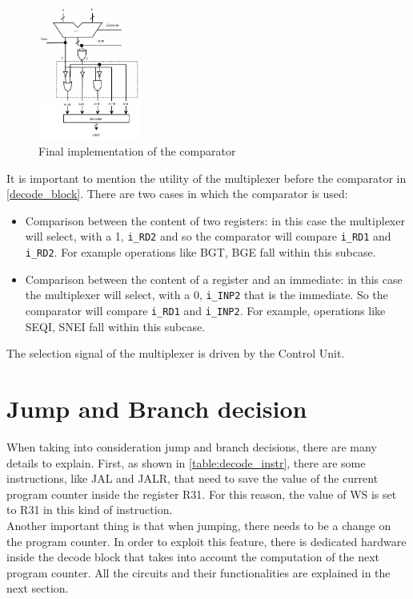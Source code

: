 \begin{figure}[H]
	\centering
	\includegraphics[width=0.3\textwidth]{chapters/4_DecodeStage/images/cmp_final.pdf}
	\caption{Final implementation of the comparator}
	\label{cmp_final}
\end{figure}

\newpage
It is important to mention the utility of the multiplexer before the comparator in \autoref{decode_block}. There are two cases in which the comparator is used:

\begin{itemize}
  \item Comparison between the content of two registers: in this case the multiplexer will select, with a 1, \texttt{i\_RD2} and so the comparator will compare \texttt{i\_RD1} and \texttt{i\_RD2}. For example operations like BGT, BGE fall within this subcase. 
  \item Comparison between the content of a register and an immediate: in this case the multiplexer will select, with a 0, \texttt{i\_INP2} that is the immediate. So the comparator will compare \texttt{i\_RD1} and \texttt{i\_INP2}. For example, operations like SEQI, SNEI fall within this subcase. 
\end{itemize}

The selection signal of the multiplexer is driven by the Control Unit.

\section{Jump and Branch decision}
When taking into consideration jump and branch decisions, there are many details to explain. First, as shown in \autoref{table:decode_instr}, there are some instructions, like JAL and JALR, that need to save the value of the current program counter inside the register R31. For this reason, the value of WS is set to R31 in this kind of instruction. \\

Another important thing is that when jumping, there needs to be a change on the program counter. In order to exploit this feature, there is dedicated hardware inside the decode block that takes into account the computation of the next program counter. All the circuits and their functionalities are explained in the next section. \\

